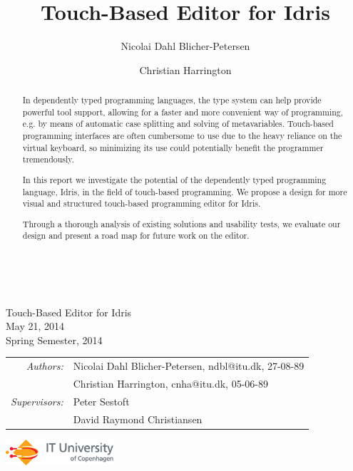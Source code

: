 \documentclass[a4paper,11pt]{report}
\begin{document}
\title{Touch-Based Editor for Idris}
\author{Nicolai Dahl Blicher-Petersen \and Christian Harrington \\
}


\begin{titlepage}
\ \\
\vspace{3cm}
\begin{center}
{\huge\sffamily
Touch-Based Editor for Idris
\\}\bigskip
{\large\sffamily
May 21, 2014
\\}
{\sffamily Spring Semester, 2014}
\end{center}
\vspace{3cm}
\large
\begin{center}
\begin{tabular}{r@{  }l}
\emph{\sffamily Authors:} & \textsf{Nicolai Dahl Blicher-Petersen, ndbl@itu.dk, 27-08-89}\\
 & \textsf{Christian Harrington, cnha@itu.dk, 05-06-89}\\
\emph{\sffamily Supervisors:} & \textsf{Peter Sestoft} \\
 & \textsf{David Raymond Christiansen}
\end{tabular}
\end{center}
\vfill
\includegraphics[width=4cm]{ITU_logo_ENG_horisontal}
\end{titlepage}


\begin{abstract}
In dependently typed programming languages, the type system can help provide powerful tool support, allowing for a faster and more convenient way of programming, e.g. by means of automatic case splitting and solving of metavariables. 
Touch-based programming interfaces are often cumbersome to use due to the heavy reliance on the virtual keyboard, so minimizing its use could potentially benefit the programmer tremendously.

In this report we investigate the potential of the dependently typed programming language, Idris, in the field of touch-based programming.
We propose a design for more visual and structured touch-based programming editor for Idris.

Through a thorough analysis of existing solutions and usability tests, we evaluate our design and present a road map for future work on the editor.


\tableofcontents

\end{abstract}
\end{document}
